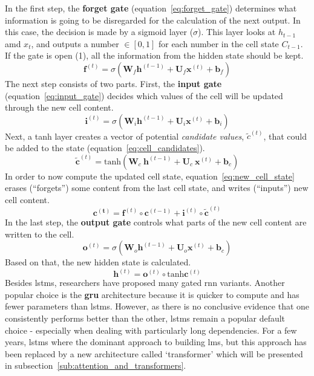In the first step, the \textbf{forget gate} (equation~\ref{eq:forget_gate}) determines what information is going to be disregarded for the calculation of the next output. In this case, the decision is made by a sigmoid layer ($ \sigma $). This layer looks at $ h_{t-1} $ amd $ x_t $, and outputs a number $ \in [0, 1] $ for each number in the cell state $ C_{t-1} $. If the gate is open (1), all the information from the hidden state should be kept.
\begin{equation}
	\label{eq:forget_gate}
	\pmb{f}^{(t)} = \sigma \left( \pmb{W}_f \pmb{h}^{(t-1)} + \pmb{U}_f \pmb{x}^{(t)} + \pmb{b}_f \right)
\end{equation}
The next step consists of two parts. First, the \textbf{input gate} (equation~\ref{eq:input_gate}) decides which values of the cell will be updated through the new cell content.
\begin{equation}
	\label{eq:input_gate}
	\pmb{i}^{(t)} = \sigma \left( \pmb{W}_i \pmb{h}^{(t-1)} + \pmb{U}_i \pmb{x}^{(t)} + \pmb{b}_i \right)
\end{equation}
Next, a tanh layer creates a vector of potential \textit{candidate values}, $ \widetilde{c}^{(t)} $, that could be added to the state (equation~\ref{eq:cell_candidates}).
\begin{equation}
	\label{eq:cell_candidates}
	\widetilde{\pmb{c}}^{(t)} = \text{tanh} \left( \pmb{W}_c \ \pmb{h}^{(t-1)} + \pmb{U}_c \ \pmb{x}^{(t)} + \pmb{b}_c \right)
\end{equation}
In order to now compute the updated cell state, equation~\ref{eq:new_cell_state} erases (``forgets'') some content from the last cell state, and writes (``inputs'') new cell content.
\begin{equation}
	\label{eq:new_cell_state}
	\pmb{c^{(t)}} = \pmb{f}^{(t)} \circ \pmb{c}^{(t-1)} + \pmb{i}^{(t)} \circ \widetilde{\pmb{c}}^{(t)}
\end{equation}
In the last step, the \textbf{output gate} controls what parts of the new cell content are written to the cell.
\begin{equation}
	\pmb{o}^{(t)} = \sigma \left( \pmb{W}_o \pmb{h}^{(t-1)} + \pmb{U}_o \pmb{x}^{(t)} + \pmb{b}_c \right)
\end{equation}
Based on that, the new hidden state is calculated.
\begin{equation}
	\pmb{h}^{(t)} = \pmb{o}^{(t)} \circ \text{tanh} \pmb{c}^{(t)}
\end{equation}
Besides \gls{lstm}s, researchers have proposed many gated \gls{rnn} variants. Another popular choice is the \textbf{\gls{gru}} architecture because it is quicker to compute and has fewer parameters than \gls{lstm}s. However, as there is no conclusive evidence that one consistently performs better than the other, \gls{lstm}s remain a popular default choice - especially when dealing with particularly long dependencies. For a few years, \gls{lstm}s where the dominant approach to building \gls{lm}s, but this approach has been replaced by a new architecture called `transformer' which will be presented in subsection~\ref{sub:attention_and_transformers}.

